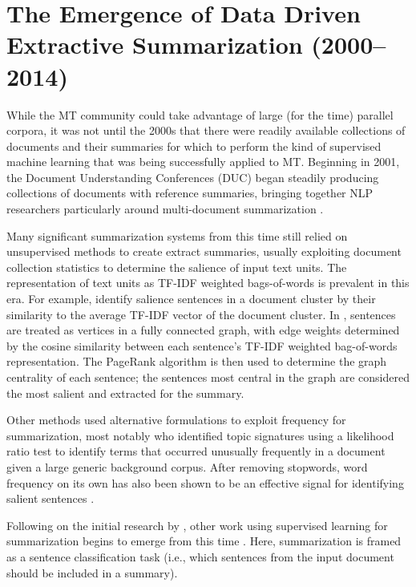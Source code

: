 \section{The Emergence of Data Driven Extractive Summarization (2000--2014)}

While the MT community could take advantage of large (for the time) parallel
corpora,  it was not until the 2000s that there were readily available
collections of documents and their summaries for which to perform the kind of
supervised machine learning that was being successfully applied to MT.
Beginning in 2001, the Document Understanding Conferences (DUC) began steadily
producing collections of documents with reference summaries, bringing together
NLP researchers particularly around multi-document summarization
\citep{jones1999,harman2001,nenkova2005b}.
  
Many significant summarization systems from this time still relied on
unsupervised methods to create extract summaries, usually exploiting document
collection statistics to determine the salience of input text units.  The
representation of text units as TF-IDF weighted bags-of-words
\citep{jones1972} is prevalent in this era. For example, \cite{radev2000}
identify salience sentences in a document cluster by their similarity to the
average TF-IDF vector of the document cluster. In \cite{erkan2004}, sentences
are treated as vertices in a fully connected graph, with edge weights
determined by the cosine similarity between each sentence's TF-IDF weighted
bag-of-words representation. The PageRank algorithm \citep{page1999} is then
used to determine the graph centrality of each sentence; the sentences most
central in the graph are considered the most salient and extracted for the
summary. 

Other methods used alternative formulations to exploit frequency for
summarization, most notably \cite{lin2000} who identified topic signatures
using a likelihood ratio test \citep{dunning1993} to identify terms that
occurred unusually frequently in a document given a large generic background
corpus. After removing stopwords, word frequency on its own has also been
shown to be an effective signal for identifying salient sentences
\citep{nenkova2005}.

Following on the initial research by \cite{kupiec1995trainable}, other work
using supervised learning for summarization begins to emerge from this time
\citep{conroy2001using,osborne2002using,hirao2002extracting,sipos2012large}.
Here, summarization is framed as a sentence classification task (i.e., which
sentences from the input document should be included in a summary). 

